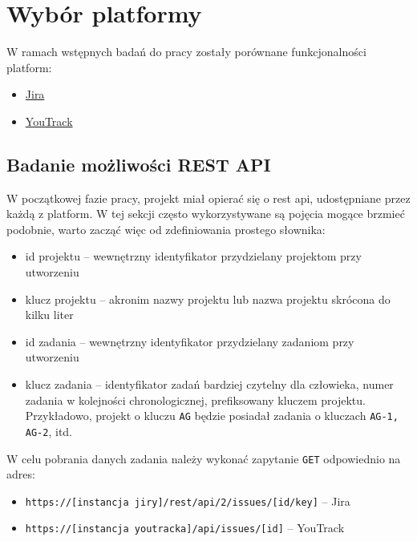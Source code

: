 \section{Wybór platformy}
W ramach wstępnych badań do pracy zostały porównane funkcjonalności platform:
\begin{itemize}
    \item \href{https://www.atlassian.com/software/jira}{Jira}
    \item \href{https://www.jetbrains.com/youtrack/}{YouTrack}
\end{itemize}

\subsection*{Badanie możliwości REST API}
W początkowej fazie pracy, projekt miał opierać się o rest api, udostępniane przez każdą z platform. \cite{JiraApiDocumentation} \cite{YouTrackApiDocumentation}
W tej sekcji często wykorzystywane są pojęcia mogące brzmieć podobnie, warto zacząć więc od zdefiniowania prostego słownika:
\begin{itemize}
    \item id projektu -- wewnętrzny identyfikator przydzielany projektom przy utworzeniu
    \item klucz projektu -- akronim nazwy projektu lub nazwa projektu skrócona do kilku liter
    \item id zadania -- wewnętrzny identyfikator przydzielany zadaniom przy utworzeniu
    \item klucz zadania -- identyfikator zadań bardziej czytelny dla człowieka, numer zadania w kolejności chronologicznej, prefiksowany kluczem projektu.
    Przykładowo, projekt o kluczu \texttt{AG} będzie posiadał zadania o kluczach \texttt{AG-1, AG-2}, itd.
\end{itemize}

W celu pobrania danych zadania należy wykonać zapytanie \texttt{GET} odpowiednio na adres:
\begin{itemize}
    \item \texttt{https://[instancja jiry]/rest/api/2/issues/[id/key]} -- Jira
    \item \texttt{https://[instancja youtracka]/api/issues/[id]} -- YouTrack
\end{itemize}


